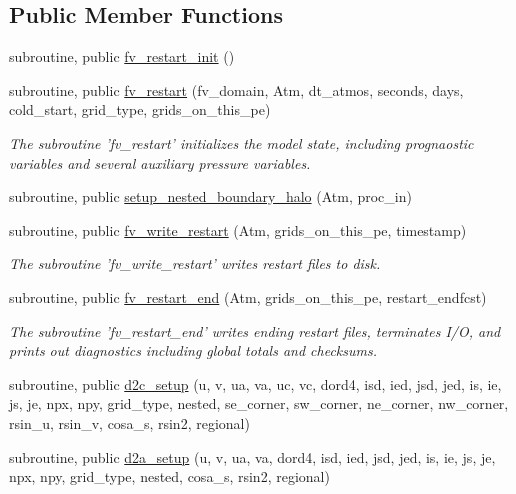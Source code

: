 \subsection*{Public Member Functions}
\begin{DoxyCompactItemize}
\item 
subroutine, public \hyperlink{classfv__restart__mod_a621f1e1f020776cafc4138bbb7d1cad8}{fv\-\_\-restart\-\_\-init} ()
\item 
subroutine, public \hyperlink{classfv__restart__mod_aaa447f67223fef4de61917a1a912a133}{fv\-\_\-restart} (fv\-\_\-domain, Atm, dt\-\_\-atmos, seconds, days, cold\-\_\-start, grid\-\_\-type, grids\-\_\-on\-\_\-this\-\_\-pe)
\begin{DoxyCompactList}\small\item\em The subroutine 'fv\-\_\-restart' initializes the model state, including prognaostic variables and several auxiliary pressure variables. \end{DoxyCompactList}\item 
subroutine, public \hyperlink{classfv__restart__mod_a3edb12b5afa532405af7999fe51c072c}{setup\-\_\-nested\-\_\-boundary\-\_\-halo} (Atm, proc\-\_\-in)
\item 
subroutine, public \hyperlink{classfv__restart__mod_a4e73a658fb6e3a1e2425e248c355a777}{fv\-\_\-write\-\_\-restart} (Atm, grids\-\_\-on\-\_\-this\-\_\-pe, timestamp)
\begin{DoxyCompactList}\small\item\em The subroutine 'fv\-\_\-write\-\_\-restart' writes restart files to disk. \end{DoxyCompactList}\item 
subroutine, public \hyperlink{classfv__restart__mod_aff5124feaf0d1c21d2ce048759630069}{fv\-\_\-restart\-\_\-end} (Atm, grids\-\_\-on\-\_\-this\-\_\-pe, restart\-\_\-endfcst)
\begin{DoxyCompactList}\small\item\em The subroutine 'fv\-\_\-restart\-\_\-end' writes ending restart files, terminates I/\-O, and prints out diagnostics including global totals and checksums. \end{DoxyCompactList}\item 
subroutine, public \hyperlink{classfv__restart__mod_aecfdd9a6af6ad75d5ab832269949a793}{d2c\-\_\-setup} (u, v, ua, va, uc, vc, dord4, isd, ied, jsd, jed, is, ie, js, je, npx, npy, grid\-\_\-type, nested, se\-\_\-corner, sw\-\_\-corner, ne\-\_\-corner, nw\-\_\-corner, rsin\-\_\-u, rsin\-\_\-v, cosa\-\_\-s, rsin2, regional)
\item 
subroutine, public \hyperlink{classfv__restart__mod_a746a84a5ae424f0b7b042212ff2c2492}{d2a\-\_\-setup} (u, v, ua, va, dord4, isd, ied, jsd, jed, is, ie, js, je, npx, npy, grid\-\_\-type, nested, cosa\-\_\-s, rsin2, regional)
\end{DoxyCompactItemize}
